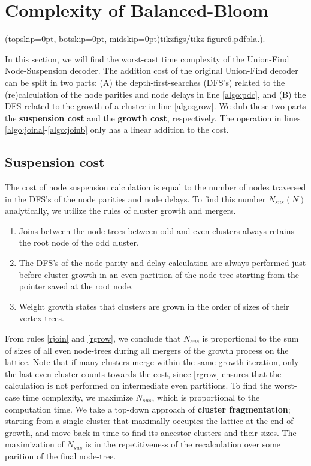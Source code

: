 
\section{Complexity of Balanced-Bloom}\label{sec:complexity}

\Figure[htb](topskip=0pt, botskip=0pt, midskip=0pt){tikzfigs/tikz-figure6.pdf}{bla.).\label{fig6}}

In this section, we will find the worst-cast time complexity of the Union-Find Node-Suspension decoder. The addition cost of the original Union-Find decoder can be split in two parts: (A) the depth-first-searches (DFS's) related to the (re)calculation of the node parities and node delays in line \ref{algo:pdc}, and (B) the DFS related to the growth of a cluster in line \ref{algo:grow}. We dub these two parts the \textbf{suspension cost} and the \textbf{growth cost}, respectively. The  operation in lines \ref{algo:joina}-\ref{algo:joinb} only has a linear addition to the cost.

\subsection{Suspension cost}\label{sec:suscomplexity}

The cost of node suspension calculation is equal to the number of nodes traversed in the DFS's of the node parities and node delays. To find this number $N_{sus}(N)$ analytically, we utilize the rules of cluster growth and mergers.


\begin{enumerate}[label=\textbf{R\arabic*},ref=R\arabic*]
  \item Joins between the node-trees between odd and even clusters always retains the root node of the odd cluster. \label{rjoin}
  \item The DFS's of the node parity and delay calculation are always performed just before cluster growth in an even partition of the node-tree starting from the pointer saved at the root node. \label{rgrow}
  \item Weight growth states that clusters are grown in the order of sizes of their vertex-trees. \label{rweight}
\end{enumerate}
From rules \ref{rjoin} and \ref{rgrow}, we conclude that $N_{sus}$ is proportional to the sum of sizes of all even node-trees during all mergers of the growth process on the lattice. Note that if many clusters merge within the same growth iteration, only the last even cluster counts towards the cost, since \ref{rgrow} ensures that the calculation is not performed on intermediate even partitions. To find the worst-case time complexity, we maximize $N_{sus}$, which is proportional to the computation time. We take a top-down approach of \textbf{cluster fragmentation}; starting from a single cluster that maximally occupies the lattice at the end of growth, and move back in time to find its ancestor clusters and their sizes. The maximization of $N_{sus}$ is in the repetitiveness of the recalculation over some parition of the final node-tree. 

